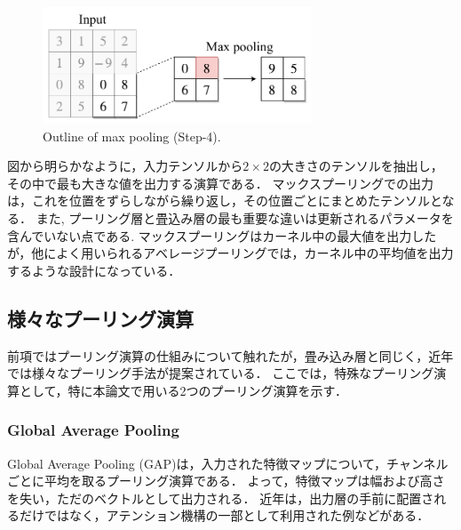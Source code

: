     \begin{figure}[ht]
      \centering
      \includegraphics[width=8cm]{8_appendix/img/max_pooling_step4.pdf}
      \caption{Outline of max pooling (Step-4).}
      \label{fig:ex_maxpooling_step_4}
    \end{figure}
    図から明らかなように，入力テンソルから$2 \times 2$の大きさのテンソルを抽出し，その中で最も大きな値を出力する演算である．
    マックスプーリングでの出力は，これを位置をずらしながら繰り返し，その位置ごとにまとめたテンソルとなる．
    また, プーリング層と畳込み層の最も重要な違いは更新されるパラメータを含んでいない点である.
    マックスプーリングはカーネル中の最大値を出力したが，他によく用いられるアベレージプーリングでは，カーネル中の平均値を出力するような設計になっている．

\subsection{様々なプーリング演算}
    前項ではプーリング演算の仕組みについて触れたが，畳み込み層と同じく，近年では様々なプーリング手法が提案されている．
    ここでは，特殊なプーリング演算として，特に本論文で用いる2つのプーリング演算を示す．
    
    \subsubsection{Global Average Pooling}
    Global Average Pooling (GAP)は，入力された特徴マップについて，チャンネルごとに平均を取るプーリング演算である．
    よって，特徴マップは幅および高さを失い，ただのベクトルとして出力される．
    近年は，出力層の手前に配置されるだけではなく，アテンション機構の一部として利用された例などがある\cite{hu2018squeeze}．
    

